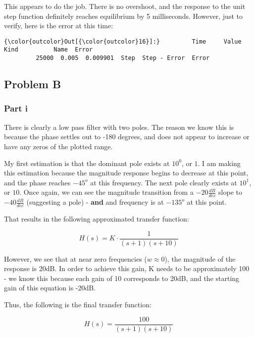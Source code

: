 \documentclass[11pt]{article}
\begin{document}
    This appears to do the job. There is no overshoot, and the response to
the unit step function definitely reaches equilibrium by 5 milliseconds.
However, just to verify, here is the error at this time:

\begin{Verbatim}[commandchars=\\\{\}]
{\color{outcolor}Out[{\color{outcolor}16}]:}         Time     Value  Kind          Name  Error
         25000  0.005  0.009901  Step  Step - Error  Error
\end{Verbatim}
    
    
\subsection{Problem B}
\subsubsection{Part i}
There is clearly a low pass filter with two poles. The reason we know
this is because the phase settles out to -180 degrees, and does not
appear to increase or have any zeros of the plotted range.

My first estimation is that the dominant pole exists at \(10^0\), or
\(1\). I am making this estimation because the magnitude response begins
to decrease at this point, and the phase reaches \(-45^o\) at this
frequency. The next pole clearly exists at \(10^1\), or \(10\). Once
again, we can see the magnitude transition from a \(-20 \frac{dB}{dec}\)
slope to \(-40 \frac{dB}{dec}\) (suggesting a pole) - \textbf{and} and
frequency is at \(-135^o\) at this point.

That results in the following approximated transfer function:

\[H(s)=K\cdot \frac{1}{(s+1)(s+10)}\]

However, we see that at near zero frequencies (\(w\approx 0\)), the
magnitude of the response is 20dB. In order to achieve this gain, K
needs to be approximately 100 - we know this because each gain of 10
corresponds to 20dB, and the starting gain of this equation is -20dB.

Thus, the following is the final transfer function:

\[H(s)=\frac{100}{(s+1)(s+10)}\]


    \begin{center}
    \end{center}
    { \hspace*{\fill} \\}
    
\end{document}
